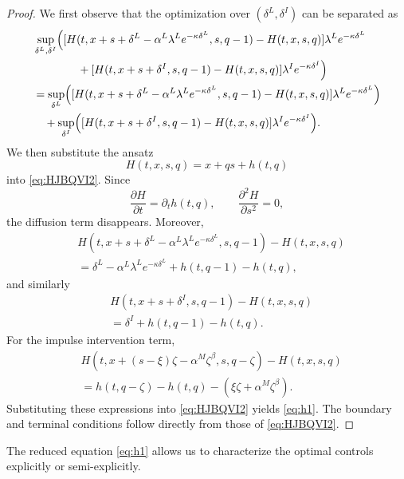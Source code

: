 \documentclass[12pt]{article}
\begin{document}
\begin{proof}
We first observe that the optimization over
$(\delta^L,\delta^I)$
can be separated as
\begin{align*}
&\sup_{\delta^L,\delta^I}
\Bigl(
[H(t,x+s+\delta^L-\alpha^L\lambda^L e^{-\kappa\delta^L},s,q-1)
-
H(t,x,s,q)]
\lambda^L e^{-\kappa\delta^L}
\\
&\qquad\qquad+
[H(t,x+s+\delta^I,s,q-1)
-
H(t,x,s,q)]
\lambda^I e^{-\kappa\delta^I}
\Bigr)
\\
&=
\sup_{\delta^L}
\Bigl(
[H(t,x+s+\delta^L-\alpha^L\lambda^L e^{-\kappa\delta^L},s,q-1)
-
H(t,x,s,q)]
\lambda^L e^{-\kappa\delta^L}
\Bigr)
\\
&\quad+
\sup_{\delta^I}
\Bigl(
[H(t,x+s+\delta^I,s,q-1)
-
H(t,x,s,q)]
\lambda^I e^{-\kappa\delta^I}
\Bigr).
\end{align*}
We then substitute the ansatz
\[
H(t,x,s,q)=x+qs+h(t,q)
\]
into \eqref{eq:HJBQVI2}.
Since
\[
\frac{\partial H}{\partial t}
=
\partial_t h(t,q),
\qquad
\frac{\partial^2H}{\partial s^2}
=
0,
\]
the diffusion term disappears.
Moreover,
\begin{align*}
&H(t,x+s+\delta^L-\alpha^L\lambda^L e^{-\kappa\delta^L},s,q-1)
-
H(t,x,s,q)
\\
&=
\delta^L
-\alpha^L\lambda^L e^{-\kappa\delta^L}
+h(t,q-1)-h(t,q),
\end{align*}
and similarly
\begin{align*}
&H(t,x+s+\delta^I,s,q-1)
-
H(t,x,s,q)
\\
&=
\delta^I+h(t,q-1)-h(t,q).
\end{align*}
For the impulse intervention term,
\begin{align*}
&H(t,x+(s-\xi)\zeta-\alpha^M\zeta^\beta,s,q-\zeta)
-
H(t,x,s,q)
\\
&=
h(t,q-\zeta)-h(t,q)
-(\xi\zeta+\alpha^M\zeta^\beta).
\end{align*}
Substituting these expressions into
\eqref{eq:HJBQVI2}
yields
\eqref{eq:h1}.
The boundary and terminal conditions follow directly from those of
\eqref{eq:HJBQVI2}.
\end{proof}

The reduced equation \eqref{eq:h1}
allows us to characterize the optimal controls explicitly or semi-explicitly.
\end{document}
